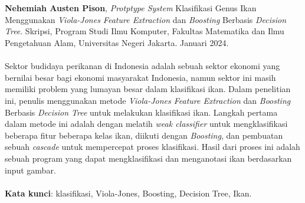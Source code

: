 \chapter*{}
\singlespacing{}

\textbf{Nehemiah Austen Pison}, \textit{Protptype System} Klasifikasi Genus Ikan 
Menggunakan \textit{Viola-Jones Feature Extraction} dan \textit{Boosting} Berbasis 
\textit{Decision Tree}. Skripsi, Program Studi Ilmu Komputer, Fakultas Matematika dan Ilmu Pengetahuan Alam, Universitas Negeri Jakarta. Januari 2024.
\\
\\
Sektor budidaya perikanan di Indonesia adalah 
sebuah sektor ekonomi yang bernilai besar bagi ekonomi 
masyarakat Indonesia, namun sektor ini masih memiliki problem yang lumayan besar 
dalam klasifikasi ikan.
Dalam penelitian ini, penulis menggunakan 
metode \emph{Viola-Jones Feature Extraction} dan \textit{Boosting} Berbasis 
\emph{Decision Tree} untuk melakukan klasifikasi ikan. Langkah pertama dalam metode ini adalah dengan melatih \emph{weak classifier} 
untuk mengklasifikasi beberapa fitur beberapa kelas ikan, diikuti dengan \emph{Boosting}, 
dan pembuatan sebuah \emph{cascade} untuk mempercepat proses klasifikasi. Hasil dari proses ini adalah 
sebuah program yang dapat mengklasifikasi dan menganotasi ikan berdasarkan input gambar.
\\
\\
\textbf{Kata kunci}: klasifikasi, Viola-Jones, Boosting, Decision Tree, Ikan.
